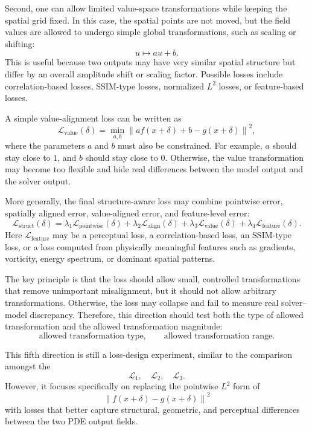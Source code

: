 \documentclass{article}
\begin{document}
Second, one can allow limited value-space transformations while keeping the spatial grid fixed. In this case, the spatial points are not moved, but the field values are allowed to undergo simple global transformations, such as scaling or shifting:
\[
u \mapsto au+b.
\]
This is useful because two outputs may have very similar spatial structure but differ by an overall amplitude shift or scaling factor. Possible losses include correlation-based losses, SSIM-type losses, normalized \(L^2\) losses, or feature-based losses.

A simple value-alignment loss can be written as
\[
\mathcal{L}_{\mathrm{value}}(\delta)
=
\min_{a,b}
\left\|
a f(x+\delta) + b
-
g(x+\delta)
\right\|^2,
\]
where the parameters \(a\) and \(b\) must also be constrained. For example, \(a\) should stay close to \(1\), and \(b\) should stay close to \(0\). Otherwise, the value transformation may become too flexible and hide real differences between the model output and the solver output.

More generally, the final structure-aware loss may combine pointwise error, spatially aligned error, value-aligned error, and feature-level error:
\[
\mathcal{L}_{\mathrm{struct}}(\delta)
=
\lambda_1
\mathcal{L}_{\mathrm{pointwise}}(\delta)
+
\lambda_2
\mathcal{L}_{\mathrm{align}}(\delta)
+
\lambda_3
\mathcal{L}_{\mathrm{value}}(\delta)
+
\lambda_4
\mathcal{L}_{\mathrm{feature}}(\delta).
\]
Here \(\mathcal{L}_{\mathrm{feature}}\) may be a perceptual loss, a correlation-based loss, an SSIM-type loss, or a loss computed from physically meaningful features such as gradients, vorticity, energy spectrum, or dominant spatial patterns.

The key principle is that the loss should allow small, controlled transformations that remove unimportant misalignment, but it should not allow arbitrary transformations. Otherwise, the loss may collapse and fail to measure real solver--model discrepancy. Therefore, this direction should test both the type of allowed transformation and the allowed transformation magnitude:
\[
\text{allowed transformation type},
\qquad
\text{allowed transformation range}.
\]

This fifth direction is still a loss-design experiment, similar to the comparison amongst the
\[
\mathcal{L}_1,\quad
\mathcal{L}_2,\quad
\mathcal{L}_3.
\]
However, it focuses specifically on replacing the pointwise \(L^2\) form of
\[
\left\|
f(x+\delta)-g(x+\delta)
\right\|^2
\]
with losses that better capture structural, geometric, and perceptual differences between the two PDE output fields.
\end{document}
